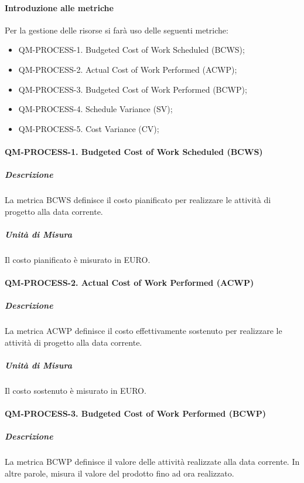 		\paragraph{Introduzione alle metriche}

		Per la gestione delle risorse si farà uso delle seguenti metriche:

		\begin{itemize}
			\item QM-PROCESS-1. Budgeted Cost of Work Scheduled (BCWS);
			\item QM-PROCESS-2. Actual Cost of Work Performed (ACWP);
			\item QM-PROCESS-3. Budgeted Cost of Work Performed (BCWP);
			\item QM-PROCESS-4. Schedule Variance (SV);
			\item QM-PROCESS-5. Cost Variance (CV);
		\end{itemize}

		\paragraph{QM-PROCESS-1. Budgeted Cost of Work Scheduled (BCWS)}

			\subparagraph{Descrizione}
			La metrica BCWS definisce il costo pianificato per realizzare le attività di progetto alla data corrente. 

			\subparagraph{Unità di Misura}
			Il costo pianificato è misurato in EURO.

		\paragraph{QM-PROCESS-2. Actual Cost of Work Performed (ACWP)}

			\subparagraph{Descrizione}
			La metrica ACWP definisce il costo effettivamente sostenuto per realizzare le attività di progetto alla data corrente. 

			\subparagraph{Unità di Misura}
			Il costo sostenuto è misurato in EURO.

		\paragraph{QM-PROCESS-3. Budgeted Cost of Work Performed (BCWP)}

			\subparagraph{Descrizione}
			La metrica BCWP definisce il valore delle attività realizzate alla data corrente. In altre parole, misura il valore del prodotto fino ad ora realizzato.

